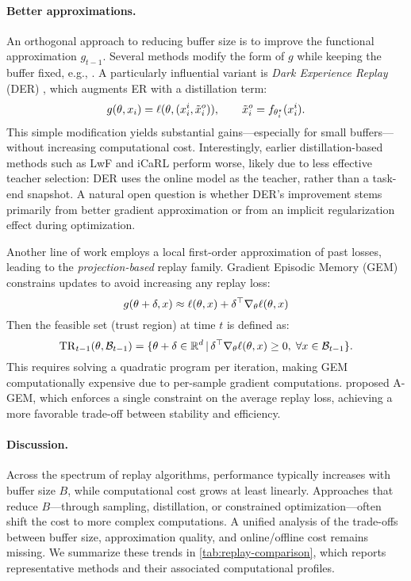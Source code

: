 \documentclass[10pt]{article} %
\begin{document}
\paragraph{Better approximations.}
An orthogonal approach to reducing buffer size is to improve the functional approximation $g_{t-1}$.  
Several methods modify the form of $g$ while keeping the buffer fixed, e.g., \citet{rebuffiICaRLIncrementalClassifier2017,houLearningUnifiedClassifier2019a,simonLearningGeodesicPath2021,iscenMemoryEfficientIncrementalLearning2020}.  
A particularly influential variant is \emph{Dark Experience Replay} (DER) \citep{buzzegaDarkExperienceGeneral2020,boschiniClassIncrementalContinualLearning2023}, which augments ER with a distillation term:
\[
g(\theta, x_i) = \ell(\theta, (x_i^{i}, \tilde{x}_i^o)), 
\qquad \tilde{x}_i^o = f_{\theta_i^\star}(x_i^{i}).
\]
This simple modification yields substantial gains—especially for small buffers—without increasing computational cost.  
Interestingly, earlier distillation-based methods such as LwF \citep{liLearningForgetting2017a} and iCaRL \citep{rebuffiICaRLIncrementalClassifier2017} perform worse, likely due to less effective teacher selection: DER uses the online model as the teacher, rather than a task-end snapshot.  
A natural open question is whether DER’s improvement stems primarily from better gradient approximation or from an implicit regularization effect during optimization.

Another line of work employs a local first-order approximation of past losses, leading to the \emph{projection-based} replay family.  
Gradient Episodic Memory (GEM) \citep{lopez-pazGradientEpisodicMemory2017} constrains updates to avoid increasing any replay loss:
\[
g(\theta + \delta, x) \approx \ell(\theta, x) + 
\delta^\top \nabla_\theta \ell(\theta, x)
\]
Then the feasible set (trust region) at time $t$ is defined as:
\[
\mathrm{TR}_{t-1}(\theta, \mathcal{B}_{t-1}) = 
\{\theta + \delta \in \mathbb{R}^d \,|\, 
\delta^\top \nabla_\theta \ell(\theta, x) \ge 0, 
\;\forall x \in \mathcal{B}_{t-1}\}.
\]
This requires solving a quadratic program per iteration, making GEM computationally expensive due to per-sample gradient computations.  
\citet{chaudhryEfficientLifelongLearning2019} proposed A-GEM, which enforces a single constraint on the average replay loss, achieving a more favorable trade-off between stability and efficiency.  

\paragraph{Discussion.}
Across the spectrum of replay algorithms, performance typically increases with buffer size $B$, while computational cost grows at least linearly.  
Approaches that reduce $B$—through sampling, distillation, or constrained optimization—often shift the cost to more complex computations.  
A unified analysis of the trade-offs between buffer size, approximation quality, and online/offline cost remains missing.  
We summarize these trends in \cref{tab:replay-comparison}, which reports representative methods and their associated computational profiles.
\end{document}
